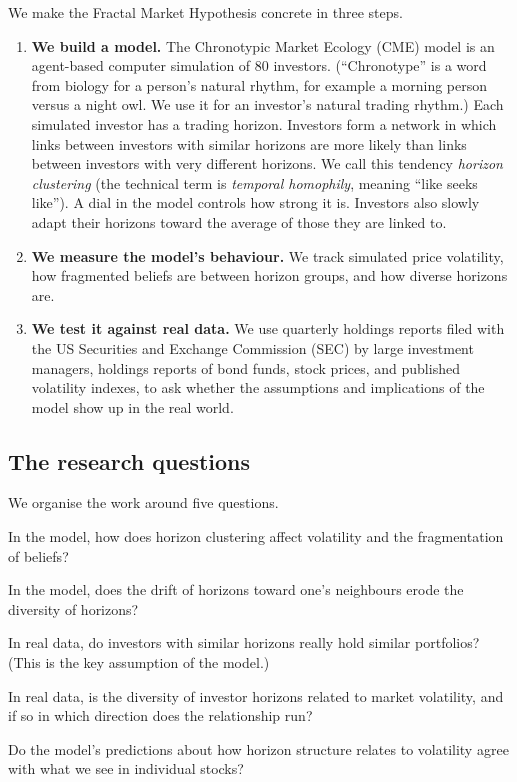 We make the Fractal Market Hypothesis concrete in three steps.

\begin{enumerate}[leftmargin=*]
\item \textbf{We build a model.} The Chronotypic Market Ecology (CME) model is an agent-based computer simulation of 80 investors. (``Chronotype'' is a word from biology for a person's natural rhythm, for example a morning person versus a night owl. We use it for an investor's natural trading rhythm.) Each simulated investor has a trading horizon. Investors form a network in which links between investors with similar horizons are more likely than links between investors with very different horizons. We call this tendency \emph{horizon clustering} (the technical term is \emph{temporal homophily}, meaning ``like seeks like''). A dial in the model controls how strong it is. Investors also slowly adapt their horizons toward the average of those they are linked to.

\item \textbf{We measure the model's behaviour.} We track simulated price volatility, how fragmented beliefs are between horizon groups, and how diverse horizons are.

\item \textbf{We test it against real data.} We use quarterly holdings reports filed with the US Securities and Exchange Commission (SEC) by large investment managers, holdings reports of bond funds, stock prices, and published volatility indexes, to ask whether the assumptions and implications of the model show up in the real world.
\end{enumerate}

\subsection{The research questions}

We organise the work around five questions.

\begin{description}[leftmargin=2.2em,style=nextline]
\item[Q1] In the model, how does horizon clustering affect volatility and the fragmentation of beliefs?
\item[Q2] In the model, does the drift of horizons toward one's neighbours erode the diversity of horizons?
\item[Q3] In real data, do investors with similar horizons really hold similar portfolios? (This is the key assumption of the model.)
\item[Q4] In real data, is the diversity of investor horizons related to market volatility, and if so in which direction does the relationship run?
\item[Q5] Do the model's predictions about how horizon structure relates to volatility agree with what we see in individual stocks?
\end{description}

